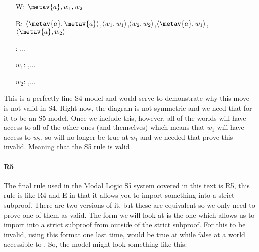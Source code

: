 \begin{center}
\end{center}
\begin{itemize}
\item[W:] $\metav{a},w_1,w_2$
\item[R:] $\openntuple \metav{a},\metav{a}\closentuple$,$\langle w_1,w_1\rangle$,$\langle w_2,w_2\rangle$,$\openntuple \metav{a},w_1\closentuple$,$\openntuple \metav{a},w_2\closentuple$  
\item[\metav{a}:] ... 
\item[$w_1$:] ,...
\item[$w_2$:] \enot{},...
\end{itemize}

This is a perfectly fine S4 model and would serve to demonstrate why this move is not valid in S4. Right now, the diagram is not symmetric and we need that for it to be an S5 model. Once we include this, however, all of the worlds will have access to all of the other ones (and themselves) which means that $w_1$ will have access to $w_2$, so \ebox{} will no longer be true at $w_1$ and we needed that prove this invalid. Meaning that the S5 rule is valid. 

\paragraph{R5}
The final rule used in the Modal Logic S5 system covered in this text is R5, this rule is like R4 and \ebox E in that it allows you to import something into a strict subproof. There are two versions of it, but these are equivalent so we only need to prove one of them as valid. The form we will look at is the one which allows us to import \ediamond{} into a strict subproof from \ediamond{} outside of the strict subproof. For this to be invalid, using this format one last time, \ediamond{} would be true at  while false at a world accessible to . So, the model might look something like this:

